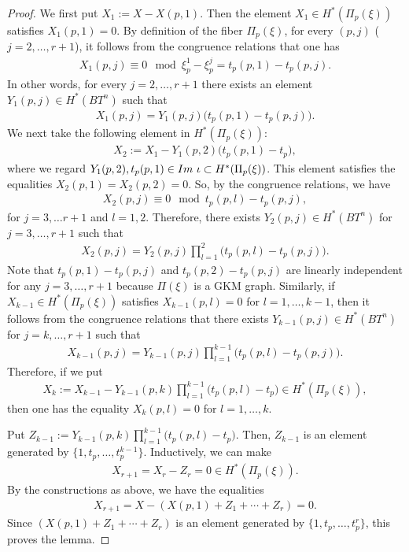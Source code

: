 \documentclass[10pt,a4paper]{amsart}
\begin{document}
\begin{proof}
We first put $X_{1}:=X-X(p,1)$.
Then the element $X_{1}\in H^{*}(\Pi_{p}(\xi))$ satisfies $X_{1}(p,1)=0$.
By definition of the fiber $\Pi_{p}(\xi)$,
for every $(p,j)$ ($j=2,\ldots, r+1$), it follows from the congruence relations that one has
\begin{align*}
X_{1}(p,j)\equiv 0 \mod \xi_{p}^{1}-\xi_{p}^{j}=t_{p}(p,1)-t_{p}(p,j).
\end{align*}
In other words, for every $j=2,\ldots, r+1$
there exists an element $Y_{1}(p,j)\in H^{*}(BT^{n})$ such that
\begin{align*}
X_{1}(p,j)
=Y_{1}(p,j)\bigl(t_{p}(p,1)-t_{p}(p,j)\bigr).
\end{align*}
We next take the following element in $H^{*}(\Pi_{p}(\xi))$:
\begin{align*}
X_{2}:=X_{1}-Y_{1}(p,2)\bigl(t_{p}(p,1)-t_{p}\bigr),
\end{align*}
where we regard $Y_{1}(p,2), t_{p}(p,1)\in {\rm Im}~\iota\subset H^{*}(\Pi_{p}(\xi))$.
This element satisfies the equalities  $X_{2}(p,1)=X_{2}(p,2)=0$.
So, by the congruence relations, we have
\begin{align*}
X_{2}(p,j)\equiv 0 \mod t_{p}(p,l)-t_{p}(p,j),
\end{align*}
for $j=3,\ldots r+1$ and $l=1,2$.
Therefore, there exists $Y_{2}(p,j)\in H^{*}(BT^{n})$ for $j=3,\ldots, r+1$ such that
\begin{align*}
X_{2}(p,j)=Y_{2}(p,j)\prod_{l=1}^{2}\bigl(t_{p}(p,l)-t_{p}(p,j)\bigr).
\end{align*}
Note that $t_{p}(p,1)-t_{p}(p,j)$ and $t_{p}(p,2)-t_{p}(p,j)$ are linearly independent for any  $j=3,\dots,r+1$ because $\Pi(\xi)$ is a GKM graph.
Similarly, if $X_{k-1}\in H^{*}(\Pi_{p}(\xi))$ satisfies $X_{k-1}(p,l)=0$ for $l=1,\ldots, k-1$, then it follows from the congruence relations that there exists  $Y_{k-1}(p,j)\in H^{*}(BT^{n})$ for $j=k,\ldots,r+1$ such that
\begin{align*}
X_{k-1}(p,j)=Y_{k-1}(p,j)\prod_{l=1}^{k-1}\bigl(t_{p}(p,l)-t_{p}(p,j)\bigr).
\end{align*}
Therefore, if we put
\begin{align*}
X_{k}:=X_{k-1}-Y_{k-1}(p,k)\prod_{l=1}^{k-1}\bigl(t_{p}(p,l)-t_{p}\bigr)\in H^{*}(\Pi_{p}(\xi)),
\end{align*}
then one has the equality $X_{k}(p,l)=0$ for $l=1,\ldots, k$.

Put $Z_{k-1}:=Y_{k-1}(p,k)\prod_{l=1}^{k-1}\bigl(t_{p}(p,l)-t_{p}\bigr)$.
Then, $Z_{k-1}$ is an element generated by $\{1,t_{p},\ldots, t_{p}^{k-1}\}$.
Inductively, we can make
\begin{align*}
X_{r+1}=X_{r}-Z_{r}=0\in H^{*}(\Pi_{p}(\xi)).
\end{align*}
By the constructions as above, we have the equalities
\begin{align*}
X_{r+1}=X-(X(p,1)+Z_{1}+\cdots +Z_{r})=0.
\end{align*}
Since $(X(p,1)+Z_{1}+\cdots +Z_{r})$ is an element generated by $\{1,t_{p},\ldots, t_{p}^{r}\}$,
this proves the lemma.
\end{proof}
\end{document}
